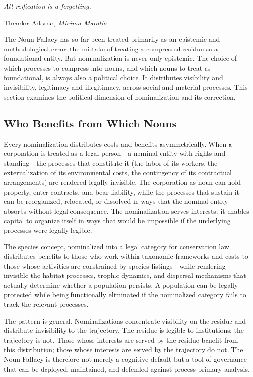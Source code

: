 \documentclass[12pt, a4paper]{article}
\theoremstyle{plain}
\theoremstyle{definition}
\theoremstyle{remark}
\begin{document}
\epigraph{\textit{All reification is a forgetting.}}{Theodor Adorno,
\textit{Minima Moralia}}

\noindent
The Noun Fallacy has so far been treated primarily as an epistemic and
methodological error: the mistake of treating a compressed residue as a
foundational entity. But nominalization is never only epistemic. The choice
of which processes to compress into nouns, and which nouns to treat as
foundational, is always also a political choice. It distributes visibility
and invisibility, legitimacy and illegitimacy, across social and material
processes. This section examines the political dimension of nominalization
and its correction.

\subsection{Who Benefits from Which Nouns}

Every nominalization distributes costs and benefits asymmetrically. When a
corporation is treated as a legal person---a nominal entity with rights and
standing---the processes that constitute it (the labor of its workers, the
externalization of its environmental costs, the contingency of its contractual
arrangements) are rendered legally invisible. The corporation as noun can hold
property, enter contracts, and bear liability, while the processes that sustain
it can be reorganized, relocated, or dissolved in ways that the nominal entity
absorbs without legal consequence. The nominalization serves interests: it
enables capital to organize itself in ways that would be impossible if the
underlying processes were legally legible.

The species concept, nominalized into a legal category for conservation law,
distributes benefits to those who work within taxonomic frameworks and costs
to those whose activities are constrained by species listings---while
rendering invisible the habitat processes, trophic dynamics, and dispersal
mechanisms that actually determine whether a population persists. A population
can be legally protected while being functionally eliminated if the nominalized
category fails to track the relevant processes.

The pattern is general. Nominalizations concentrate visibility on the residue
and distribute invisibility to the trajectory. The residue is legible to
institutions; the trajectory is not. Those whose interests are served by
the residue benefit from this distribution; those whose interests are served
by the trajectory do not. The Noun Fallacy is therefore not merely a cognitive
default but a tool of governance that can be deployed, maintained, and defended
against process-primary analysis.
\end{document}
